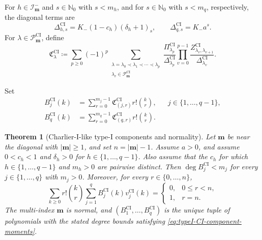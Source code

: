 \documentclass[10pt]{amsart}
\newcommand{\Nzero}{\mathbb N_0}
\newcommand{\abs}[1]{\lvert#1\rvert}
\theoremstyle{plain}
\newtheorem{theorem}{Theorem}[section]
\theoremstyle{definition}
\theoremstyle{remark}
\begin{document}
For \(h\in\mathcal I_{\boldsymbol m}^-\) and
\(s\in\Nzero\) with \(s<m_h\), and for \(s\in\Nzero\) with
\(s<m_q\), respectively, the diagonal terms are
\begin{equation}
 \Delta_{h,s}^{\mathrm{CI}}
 =K_-(1-c_h)(\delta_h+1)_s,
 \qquad
 \Delta_{q,s}^{\mathrm{CI}}=K_-a^s.
 \label{eq:typeI-CI-Delta}
\end{equation}
For \(\lambda\in\mathscr P_{\boldsymbol m}^{\mathrm{CI}}\), define
\begin{equation}
 \mathfrak C_\lambda^{\mathrm{CI}}
 \coloneq
 \sum_{p\ge0}(-1)^p
 \sum_{\substack{\lambda=\lambda_0\prec\lambda_1\prec\cdots\prec\lambda_p\\
                  \lambda_v\in\mathscr P_{\boldsymbol m}^{\mathrm{CI}}}}
 \frac{\Pi_{\lambda_p}^{\mathrm{CI}}}
 {\Delta_{\lambda_p}^{\mathrm{CI}}}
 \prod_{v=0}^{p-1}
 \frac{Z_{\lambda_v,\lambda_{v+1}}^{\mathrm{CI}}}
 {\Delta_{\lambda_v}^{\mathrm{CI}}}.
 \label{eq:typeI-CI-finite-sum}
\end{equation}

Set
\begin{align}
 B_j^{\mathrm{CI}}(k)
 &=\sum_{r=0}^{m_j-1}
 \mathfrak C_{(j,r)}^{\mathrm{CI}}r!\binom{k}{r},
 &&j\in\{1,\ldots,q-1\},\label{eq:explicit-CI-components-finite}\\
 B_q^{\mathrm{CI}}(k)
 &=\sum_{r=0}^{m_q-1}
 \mathfrak C_{(q,r)}^{\mathrm{CI}}r!\binom{k}{r}.
 \label{eq:explicit-CI-component-base}
\end{align}

\begin{theorem}[Charlier-I-like type-I components and normality]
\label{thm:explicit-CI-B}
Let \(\boldsymbol m\) be near the diagonal with
\(\abs{\boldsymbol m}\ge1\), and set \(n=\abs{\boldsymbol m}-1\).
Assume \(a>0\), and assume
\(0<c_h<1\) and \(\delta_h>0\) for
\(h\in\{1,\ldots,q-1\}\). Also assume that the \(c_h\) for which
\(h\in\{1,\ldots,q-1\}\) and \(m_h>0\) are pairwise distinct. Then
\(\deg B_j^{\mathrm{CI}}<m_j\) for every
\(j\in\{1,\ldots,q\}\) with \(m_j>0\). Moreover, for every
\(r\in\{0,\ldots,n\}\),
\begin{equation}
 \sum_{k\ge0} r!\binom{k}{r}
 \sum_{j=1}^q B_j^{\mathrm{CI}}(k)v_j^{\mathrm{CI}}(k)
 =\begin{cases}0,&0\le r<n,\\1,&r=n.\end{cases}
 \label{eq:typeI-CI-component-moments}
\end{equation}
The multi-index \(\boldsymbol m\) is normal, and
\((B_1^{\mathrm{CI}},\ldots,B_q^{\mathrm{CI}})\) is the unique tuple of
polynomials with the stated degree bounds satisfying
\eqref{eq:typeI-CI-component-moments}.
\end{theorem}
\end{document}
